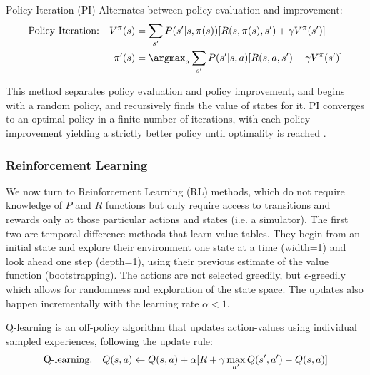Policy Iteration (PI) Alternates between policy evaluation and improvement:
\begin{align}
 \text{Policy Iteration:\quad} V^{\pi}(s) &= \sum_{s'} P(s'|s,\pi(s))[R(s,\pi(s),s') + \gamma V^{\pi}(s')] \\
\pi'(s) &= \argmax_a \sum_{s'} P(s'|s,a)[R(s,a,s') + \gamma V^{\pi}(s')]
\end{align}

This method separates policy evaluation and policy improvement, and begins with a random policy, and recursively finds the value of states for it. PI converges to an optimal policy in a finite number of iterations, with each policy improvement yielding a strictly better policy until optimality is reached \cite{bertsekas1996}.


\subsubsection{Reinforcement Learning}

We now turn to Reinforcement Learning (RL) methods, which do not require knowledge of $P$ and $R$ functions but only require access to transitions and rewards only at those particular actions and states (i.e. a simulator). The first two are temporal-difference methods that learn value tables. They begin from an initial state and explore their environment one state at a time (width=1) and look ahead one step (depth=1), using their previous estimate of the value function (bootstrapping). The actions are not selected greedily, but $\epsilon$-greedily which allows for randomness and exploration of the state space. The updates also happen incrementally with the learning rate $\alpha<1$.  

Q-learning is an off-policy algorithm that updates action-values using individual sampled experiences, following the update rule:
\begin{equation}
\text{Q-learning:\quad} Q(s,a) \leftarrow Q(s,a) + \alpha [R + \gamma \max_{a'} Q(s',a') - Q(s,a)]
\end{equation}

